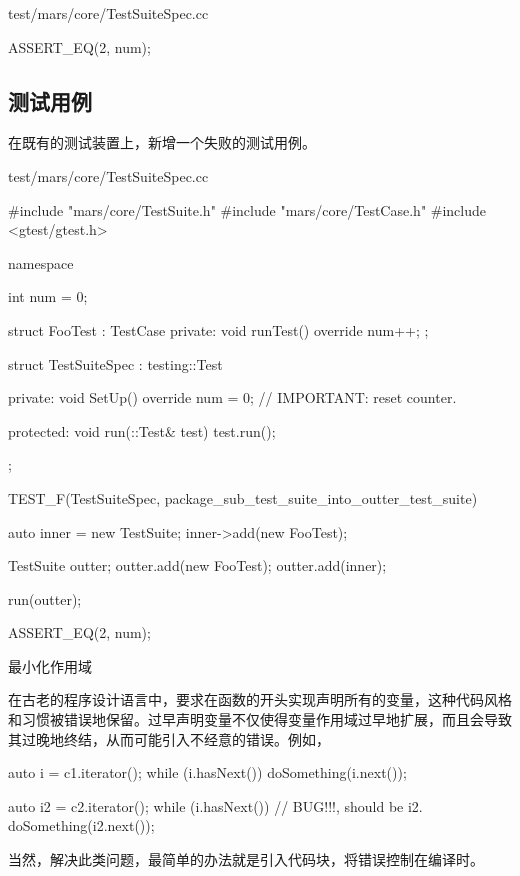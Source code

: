 \begin{content}
\begin{diff}{test/mars/core/TestSuiteSpec.cc}
\begin{minicpp}
{  ASSERT_EQ(2, num);
}
 \end{minicpp}
\end{diff}

\subsection{测试用例}

在既有的测试装置上，新增一个失败的测试用例。

\begin{nodiff}{test/mars/core/TestSuiteSpec.cc}
 \begin{c++}
#include "mars/core/TestSuite.h"
#include "mars/core/TestCase.h"
#include <gtest/gtest.h>

namespace {
  int num = 0;

  struct FooTest : TestCase {
  private:
    void runTest() override {
      num++;
    }
  };

  struct TestSuiteSpec : testing::Test {
  private:
    void SetUp() override {
      num = 0;  // IMPORTANT: reset counter.
    }

  protected:
    void run(::Test& test) {
      test.run();
    }
  };
}

TEST_F(TestSuiteSpec, package_sub_test_suite_into_outter_test_suite) {
  auto inner = new TestSuite;
  inner->add(new FooTest);

  TestSuite outter;
  outter.add(new FooTest);
  outter.add(inner);

  run(outter);

  ASSERT_EQ(2, num);
} 
\end{c++}
\end{nodiff}

\begin{episode}{最小化作用域}

\begin{content}

在古老的程序设计语言中，要求在函数的开头实现声明所有的变量，这种代码风格和习惯被错误地保留。过早声明变量不仅使得变量作用域过早地扩展，而且会导致其过晚地终结，从而可能引入不经意的错误。例如，

 \begin{c++}[title={\ttfamily{while循环}}]
auto i = c1.iterator();
while (i.hasNext()) {
  doSomething(i.next());
}

auto i2 = c2.iterator();
while (i.hasNext()) {           // BUG!!!, should be i2.
  doSomething(i2.next());
}
 \end{c++}

当然，解决此类问题，最简单的办法就是引入代码块，将错误控制在编译时。


\end{content}
\end{episode}
\end{content}
